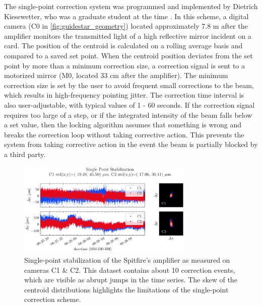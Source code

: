 The single-point correction system was programmed and implemented by Dietrich Kiesewetter, who was a graduate student at the time \cite{kiesewetterDynamicsNearThresholdAttosecond2019}. In this scheme, a digital camera (C0 in \cref{fig:guidestar_geometry}) located approximately 7.8 m after the amplifier monitors the transmitted light of a high reflective mirror incident on a card. The position of the centroid is calculated on a rolling average basis and compared to a saved set point. When the centroid position deviates from the set point by more than a minimum correction size, a correction signal is sent to a motorized mirror (M0, located 33 cm after the amplifier). The minimum correction size is set by the user to avoid frequent small corrections to the beam, which results in high-frequency pointing jitter. The correction time interval is also user-adjustable, with typical values of 1 - 60 seconds. If the correction signal requires too large of a step, or if the integrated intensity of the beam falls below a set value, then the locking algorithm assumes that something is wrong and breaks the correction loop without taking corrective action. This prevents the system from taking corrective action in the event the beam is partially blocked by a third party.

\begin{figure}
	\centering
	\includegraphics[width=0.75\textwidth]{figures/chap2/Stability_Dietrich_ON.pdf}
	\caption{Single-point stabilization of the Spitfire's amplifier as measured on cameras C1 \& C2. This dataset contains about 10 correction events, which are visible as abrupt jumps in the time series. The skew of the centroid distributions highlights the limitations of the single-point correction scheme.}
	\label{fig:guidestar_1point_stability}
\end{figure}

